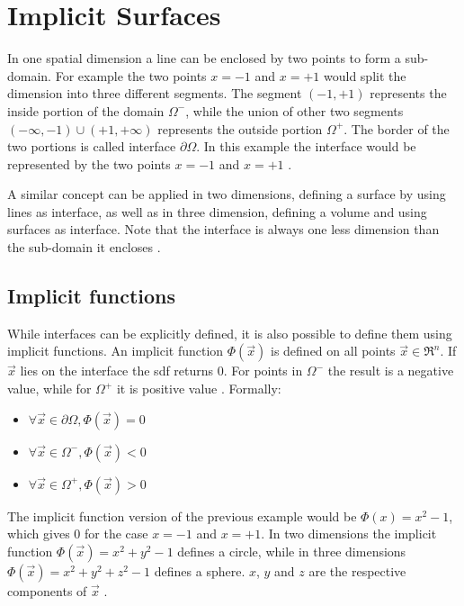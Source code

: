 \section{Implicit Surfaces}

In one spatial dimension a line can be enclosed by two points to form a sub-domain. For example the two points $x = -1$ and $x = +1$ would split the dimension into three different segments. The segment $(-1, +1)$ represents the inside portion of the domain $\Omega^-$, while the union of other two segments  $(-\infty,-1) \cup (+1,+\infty) $ represents the outside portion $\Omega^+$. The border of the two portions is called interface  $\partial\Omega$. In this example the interface would be represented by the two points $x = -1$ and $x = +1$ \cite{osher:2006:level}.

A similar concept can be applied in two dimensions, defining a surface by using lines as interface, as well as in three dimension, defining a volume and using surfaces as interface. Note that the interface is always one less dimension than the sub-domain it encloses \cite{osher:2006:level}.

\subsection{Implicit functions}

While interfaces can be explicitly defined, it is also possible to define them using implicit functions. An implicit function $\Phi(\vec{x})$ is defined on all points $\vec{x} \in \Re^n$. If $\vec{x}$ lies on the interface the \gls{sdf} returns 0. For points in $\Omega^-$ the result is a negative value, while for $\Omega^+$ it is positive value \cite{osher:2006:level}. Formally:
\begin{itemize}
	\item $\forall \vec{x} \in \partial\Omega,  \Phi(\vec{x}) = 0$ 
	\item $\forall \vec{x} \in \Omega^-,  \Phi(\vec{x}) < 0$
	\item $\forall \vec{x} \in \Omega^+,  \Phi(\vec{x}) > 0$
\end{itemize}

The implicit function version of the previous example would be $\Phi(x) = x^2 - 1$, which gives 0 for the case $x = -1$ and $x = +1$.
In two dimensions the implicit function $\Phi(\vec{x}) = x^2 + y^2 - 1$ defines a circle, while in three dimensions  $\Phi(\vec{x}) = x^2 + y^2 + z^2 - 1$ defines a sphere. $x$, $y$ and $z$ are the respective components of $\vec{x}$ \cite{osher:2006:level}.

